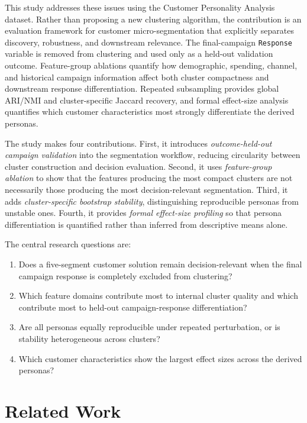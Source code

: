\documentclass[10pt]{article}
\begin{document}
This study addresses these issues using the Customer Personality Analysis dataset. Rather than proposing a new clustering algorithm, the contribution is an evaluation framework for customer micro-segmentation that explicitly separates discovery, robustness, and downstream relevance. The final-campaign \texttt{Response} variable is removed from clustering and used only as a held-out validation outcome. Feature-group ablations quantify how demographic, spending, channel, and historical campaign information affect both cluster compactness and downstream response differentiation. Repeated subsampling provides global ARI/NMI and cluster-specific Jaccard recovery, and formal effect-size analysis quantifies which customer characteristics most strongly differentiate the derived personas.

The study makes four contributions. First, it introduces \emph{outcome-held-out campaign validation} into the segmentation workflow, reducing circularity between cluster construction and decision evaluation. Second, it uses \emph{feature-group ablation} to show that the features producing the most compact clusters are not necessarily those producing the most decision-relevant segmentation. Third, it adds \emph{cluster-specific bootstrap stability}, distinguishing reproducible personas from unstable ones. Fourth, it provides \emph{formal effect-size profiling} so that persona differentiation is quantified rather than inferred from descriptive means alone.

The central research questions are:
\begin{enumerate}[label=RQ\arabic*.]
    \item Does a five-segment customer solution remain decision-relevant when the final campaign response is completely excluded from clustering?
    \item Which feature domains contribute most to internal cluster quality and which contribute most to held-out campaign-response differentiation?
    \item Are all personas equally reproducible under repeated perturbation, or is stability heterogeneous across clusters?
    \item Which customer characteristics show the largest effect sizes across the derived personas?
\end{enumerate}

\section{Related Work}
\end{document}
